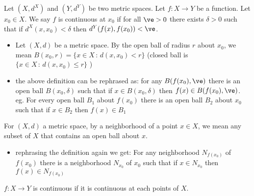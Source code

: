 Let $(X, d^X)$ and $(Y, d^Y)$ be two metric spaces. Let $f: X \to Y$ be a function. Let $x_0 \in X$. We say $f$ is continuous at $x_0$ if for all $\ve > 0$ there exists $\delta > 0$ such that if $d^X(x, x_0) < \delta$ then $d^Y(f(x), f(x_0)) < \ve$. 

\begin{itemize}
    \item Let $(X,d)$ be a metric space. By the open ball of radius $r$ about $x_0$, we mean $B(x_0, r) = \{x \in X \, : \, d(x, x_0) <r \}$ (closed ball is $\{x \in X \, : \, d(x, x_0) \le r \}$ )
    \item the above definition can be rephrased as: for any $B(f(x_0), \ve)$ there is an open ball $B(x_0, \delta)$ such that if $x \in B(x_0, \delta)$ then $f(x) \in B(f(x_0), \ve)$. \\
    eg. For every open ball $B_1$ about $f(x_0)$ there is an open ball $B_2$ about $x_0$ such that if $x \in B_2$ then $f(x) \in B_1$ 
\end{itemize}

\begin{definition}
    For $(X,d)$ a metric space, by a neighborhood of a point $x \in X$, we mean any subset of $X$ that contains an open ball about $x$. 
\end{definition}

\begin{itemize}
    \item rephrasing the definition again we get: For any neighborhood $N_{f(x_0)}$ of $f(x_0)$ there is a neighborhood $N_{x_0}$ of $x_0$ such that if $x \in N_{x_0}$ then $f(x) \in N_{f(x_0)}$ 
\end{itemize}

\begin{definition}
    $f: X \to Y$ is continuous if it is continuous at each points of $X$. 
\end{definition}

